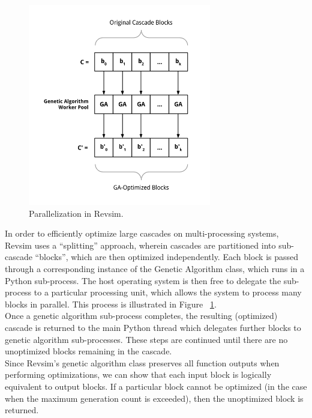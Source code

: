 \begin{figure}
  \begin{center}
    \includegraphics[width=80mm]{diagrams/parallelization.png}
  \end{center}
  \caption{Parallelization in Revsim.}
  \label{fig:parallel}
\end{figure}

In order to efficiently optimize large cascades on multi-processing systems, Revsim uses a ``splitting'' approach, wherein cascades are partitioned into sub-cascade ``blocks'', which are then optimized independently. Each block is passed through a corresponding instance of the Genetic Algorithm class, which runs in a Python sub-process. The host operating system is then free to delegate the sub-process to a particular processing unit, which allows the system to process many blocks in parallel. This process is illustrated in Figure ~\ref{fig:parallel}. \\

Once a genetic algorithm sub-process completes, the resulting (optimized) cascade is returned to the main Python thread which delegates further blocks to genetic algorithm sub-processes. These steps are continued until there are no unoptimized blocks remaining in the cascade. \\

Since Revsim's genetic algorithm class preserves all function outputs when performing optimizations, we can show that each input block is logically equivalent to output blocks. If a particular block cannot be optimized (in the case when the maximum generation count is exceeded), then the unoptimized block is returned.


